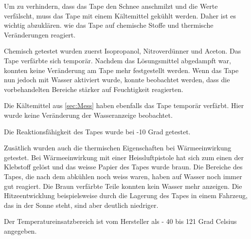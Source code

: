 
 Um zu verhindern, dass das Tape den Schnee anschmilzt und die Werte verfälscht, muss das Tape mit einem Kältemittel gekühlt werden. Daher ist es wichtig abzuklären. wie das Tape auf chemische Stoffe und thermische Veränderungen reagiert.

Chemisch getestet wurden zuerst Isopropanol, Nitroverdünner und Aceton.  Das Tape verfärbte sich temporär. Nachdem das Lösungsmittel abgedampft war, konnten keine Veränderung am Tape mehr festgestellt werden. Wenn das Tape nun jedoch mit Wasser aktiviert wurde, konnte beobachtet werden, dass die vorbehandelten Bereiche stärker auf Feuchtigkeit  reagierten. 


Die Kältemittel aus \ref{sec:Mess} haben ebenfalls das Tape temporär verfärbt. Hier wurde keine Veränderung der Wasseranzeige beobachtet.

Die Reaktionsfähigkeit des Tapes wurde bei -10 Grad getestet.

Zusätlich wurden auch die thermischen Eigenschaften bei Wärmeeinwirkung getestet. Bei Wärmeeinwirkung mit einer Heissluftpistole hat sich zum einen der Klebstoff gelöst und das weisse Papier des Tapes wurde braun. Die Bereiche des Tapes, die nach dem abkühlen noch weiss waren, haben auf Wasser noch immer gut reagiert. Die Braun verfärbte Teile konnten kein Wasser mehr anzeigen. Die Hitzeentwicklung beispielsweise durch die Lagerung des Tapes in einem Fahrzeug, das in der Sonne steht, sind aber deutlich niedriger.

Der Temperatureinsatzbereich ist vom Hersteller als - 40 bis 121 Grad Celsius angegeben.
